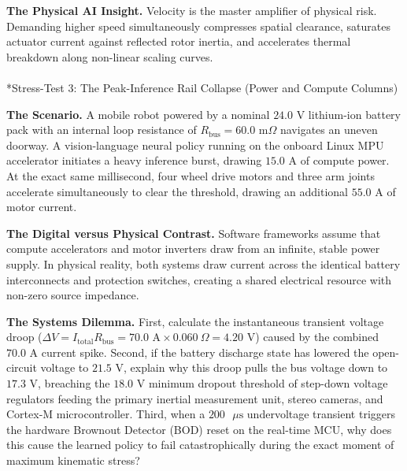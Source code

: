 \documentclass[
  letterpaper,
  DIV=11,
  numbers=noendperiod]{scrartcl}
\makeatletter
\let\oldparagraph\paragraph
\renewcommand{\paragraph}{
    \@ifstar
      \xxxParagraphStar
      \xxxParagraphNoStar
  }
\newcommand{\xxxParagraphStar}[1]{\oldparagraph*{#1}\mbox{}}
\newcommand{\xxxParagraphNoStar}[1]{\oldparagraph{#1}\mbox{}}
\makeatother
\begin{document}
\textbf{The Physical AI Insight.} Velocity is the master amplifier of
physical risk. Demanding higher speed simultaneously compresses spatial
clearance, saturates actuator current against reflected rotor inertia,
and accelerates thermal breakdown along non-linear scaling curves.

\paragraph*{Stress-Test 3: The Peak-Inference Rail Collapse (Power and
Compute
Columns)}\label{stress-test-3-the-peak-inference-rail-collapse-power-and-compute-columns}

\textbf{The Scenario.} A mobile robot powered by a nominal
\(24.0\text{ V}\) lithium-ion battery pack with an internal loop
resistance of \(R_{\text{bus}} = 60.0\text{ m}\Omega\) navigates an
uneven doorway. A vision-language neural policy running on the onboard
Linux MPU accelerator initiates a heavy inference burst, drawing
\(15.0\text{ A}\) of compute power. At the exact same millisecond, four
wheel drive motors and three arm joints accelerate simultaneously to
clear the threshold, drawing an additional \(55.0\text{ A}\) of motor
current.

\textbf{The Digital versus Physical Contrast.} Software frameworks
assume that compute accelerators and motor inverters draw from an
infinite, stable power supply. In physical reality, both systems draw
current across the identical battery interconnects and protection
switches, creating a shared electrical resource with non-zero source
impedance.

\textbf{The Systems Dilemma.} First, calculate the instantaneous
transient voltage droop
(\(\Delta V = I_{\text{total}} R_{\text{bus}} = 70.0\text{ A} \times 0.060\ \Omega = 4.20\text{ V}\))
caused by the combined \(70.0\text{ A}\) current spike. Second, if the
battery discharge state has lowered the open-circuit voltage to
\(21.5\text{ V}\), explain why this droop pulls the bus voltage down to
\(17.3\text{ V}\), breaching the \(18.0\text{ V}\) minimum dropout
threshold of step-down voltage regulators feeding the primary inertial
measurement unit, stereo cameras, and Cortex-M microcontroller. Third,
when a \(200\text{ }\mu\text{s}\) undervoltage transient triggers the
hardware Brownout Detector (BOD) reset on the real-time MCU, why does
this cause the learned policy to fail catastrophically during the exact
moment of maximum kinematic stress?
\end{document}
